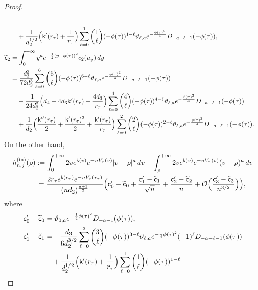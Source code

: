 \documentclass[reqno]{amsart}
\newcommand{\1}{\mathds{1}}
\numberwithin{equation}{section}
\theoremstyle{definition}
\begin{document}
\begin{proof}
\begin{align*}
\\
&\quad
+
\frac{1}{d_2^{1/2}}\Bigl(\mathsf{k}'(r_{\tau})+\frac{1}{r_{\tau}}\Bigr)
\sum_{\ell=0}^{1}\binom{1}{\ell}(-\phi(\tau))^{1-\ell}\vartheta_{\ell,a}e^{-\frac{\phi(\tau)^2}{4}}D_{-a-\ell-1}(-\phi(\tau)),
\\
\widetilde{\mathsf{c}}_2
&=
\int_{0}^{+\infty}
y^ae^{-\frac{1}{2}(y-\phi(\tau))^2}c_2(u_y)\,dy 
\\
&=
\frac{d_3^2}{72d_2^3}
\sum_{\ell=0}^{6}\binom{6}{\ell}(-\phi(\tau))^{6-\ell}\vartheta_{\ell,a}e^{-\frac{\phi(\tau)^2}{4}}D_{-a-\ell-1}(-\phi(\tau))
\\
&\quad
-\frac{1}{24d_2^2}\Bigl(d_4+4d_3\mathsf{k}'(r_{\tau})+\frac{4d_3}{r_{\tau}}\Bigr)
\sum_{\ell=0}^{4}\binom{4}{\ell}(-\phi(\tau))^{4-\ell}\vartheta_{\ell,a}e^{-\frac{\phi(\tau)^2}{4}}D_{-a-\ell-1}(-\phi(\tau))
\\
&\quad 
+\frac{1}{d_2}\Bigl(\frac{\mathsf{k}''(r_{\tau})}{2}+\frac{\mathsf{k}'(r_{\tau})^2}{2}+\frac{\mathsf{k}'(r_{\tau})}{r_{\tau}}\Bigr)
\sum_{\ell=0}^{2}\binom{2}{\ell}(-\phi(\tau))^{2-\ell}\vartheta_{\ell,a}e^{-\frac{\phi(\tau)^2}{4}}D_{-a-\ell-1}(-\phi(\tau)). 
\end{align*}
On the other hand, 
\begin{align}
\begin{split}
\label{def of hrho in second part}    
h_{n,j}^{(\mathrm{in})}(\rho)
&:=
\int_{0}^{+\infty} 2ve^{\mathsf{k}(v)}e^{-nV_{\tau}(v)}|v-\rho|^{a}\,dv
-
\int_{\rho}^{+\infty} 2ve^{\mathsf{k}(v)}e^{-nV_{\tau}(v)}(v-\rho)
^{a}\,dv
\\
&\,=
\frac{2r_{\tau}e^{\mathsf{k}(r_{\tau})}e^{-nV_{\tau}(r_{\tau})}}{(nd_2)^{\frac{a+1}{2}}}
\Bigl( 
\mathsf{c}_0'-\widetilde{\mathsf{c}}_0+\frac{\mathsf{c}_1'-\widetilde{\mathsf{c}}_1}{\sqrt{n}}+\frac{\mathsf{c}_2'-\widetilde{\mathsf{c}}_2}{n}+\mathcal{O}\Bigl(\frac{\mathsf{c}_3'-\widetilde{\mathsf{c}}_3}{n^{3/2}}\Bigr)
\Bigr),
\end{split}
\end{align}
where 
\begin{align*}
\mathsf{c}_0'-\widetilde{\mathsf{c}}_0
&=
\vartheta_{0,a}e^{-\frac{1}{4}\phi(\tau)^2}
D_{-a-1}(\phi(\tau)), 
\\
\mathsf{c}_1'-\widetilde{\mathsf{c}}_1
&=
-\frac{d_3}{6d_2^{3/2}}\sum_{\ell=0}^{3}\binom{3}{\ell}(-\phi(\tau))^{3-\ell}
\vartheta_{\ell,a}e^{-\frac{1}{4}\phi(\tau)^2}
(-1)^{\ell}D_{-a-\ell-1}(\phi(\tau))
\\ &\quad
+\frac{1}{d_2^{1/2}}\Bigl(\mathsf{k}'(r_{\tau})+\frac{1}{r_{\tau}}\Bigr)
\sum_{\ell=0}^{1}\binom{1}{\ell}(-\phi(\tau))^{1-\ell}

\end{align*}
\end{proof}
\end{document}
